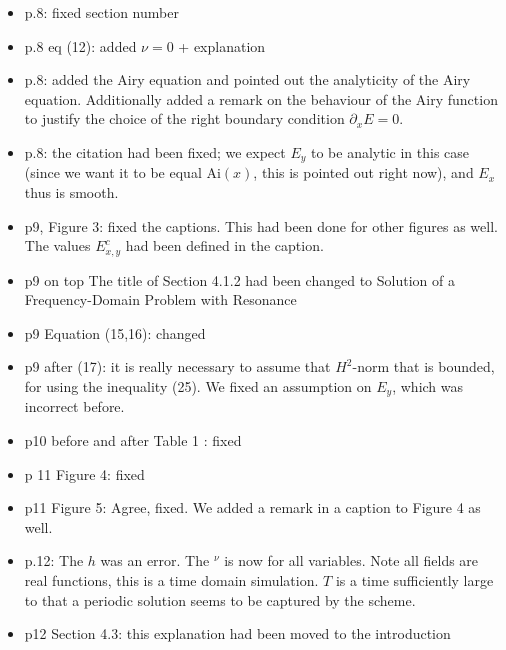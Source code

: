 \documentclass[a4paper,10pt]{article}
\begin{document}
\begin{itemize}
 \item p.8: fixed section number
 
 \item p.8 eq (12): added $\nu=0$ + explanation
 
 \item p.8: added the Airy equation and pointed out the analyticity of the Airy equation. Additionally added a remark on the behaviour of the Airy function to justify the choice of the right boundary 
 condition $\partial_x E=0$. 
 
 \item p.8: the citation had been fixed; we expect $E_y$ to be analytic in this case (since we want it to be equal $\mathrm{Ai}(x)$, this is pointed out right now), 
 and $E_x$ thus is smooth.
 
 \item  p9, Figure 3: fixed the captions. This had been done for other figures as well. The values $E^{c}_{x,y}$ had been defined in the caption.
 
 \item p9 on top
  The title of Section 4.1.2 had been changed to Solution of a Frequency-Domain Problem with Resonance
  
 \item p9 Equation (15,16): changed  

 \item p9 after (17): it is really necessary to assume that $H^2$-norm that is bounded, for using the inequality (25). 
 We fixed an assumption on $E_y$, which was incorrect before.


  
 \item p10 before and after Table 1 : fixed
 
 \item p 11 Figure 4: fixed
 
 \item p11 Figure 5:
Agree, fixed. We added a remark in a caption to Figure 4 as well.


\item p.12: 
The $h$ was an error.
The $^\nu$ is now for all variables.
Note all fields are real functions, this is a time domain simulation.
$T$ is a time sufficiently large to that a periodic solution seems 
to be captured by the scheme.

\item p12 Section 4.3: this explanation had been moved to the introduction




\end{itemize}
\end{document}
